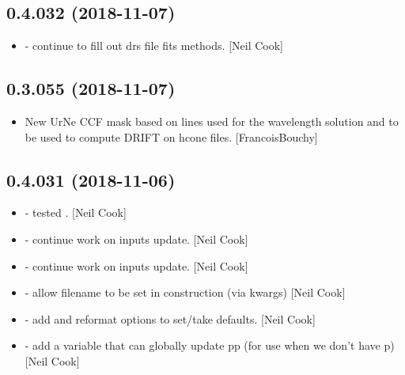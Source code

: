 \documentclass[a4paper,10pt,english]{report}
\begin{document}
\subsection{0.4.032 (2018-11-07)}
\label{\detokenize{misc/changelog:id267}}\begin{itemize}
\item {} 
 - continue to fill out drs file fits methods. {[}Neil
Cook{]}

\end{itemize}


\subsection{0.3.055 (2018-11-07)}
\label{\detokenize{misc/changelog:id268}}\begin{itemize}
\item {} 
New UrNe CCF mask based on lines used for the wavelength solution and
to be used to compute DRIFT on hcone files. {[}FrancoisBouchy{]}

\end{itemize}


\subsection{0.4.031 (2018-11-06)}
\label{\detokenize{misc/changelog:id269}}\begin{itemize}
\item {} 
 - tested . {[}Neil Cook{]}

\item {} 
 - continue work on inputs update. {[}Neil Cook{]}

\item {} 
 - continue work on inputs update. {[}Neil Cook{]}

\item {} 
 - allow filename to be set in construction (via kwargs)
{[}Neil Cook{]}

\item {} 
 - add and reformat options to set/take defaults.
{[}Neil Cook{]}

\item {} 
 - add a variable that can globally update pp (for use
when we don’t have p) {[}Neil Cook{]}

\end{itemize}
\end{document}
